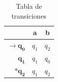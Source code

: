 \documentclass[12pt, twoside, openright]{report} %
\begin{document}
\begin{multicols}{2}
\begin{table}[H]
\centering
\begin{tabular}{r|c|c|}
\cline{2-3}
\multicolumn{1}{l|}{}                                & \textbf{a} & \textbf{b} \\ \hline
\multicolumn{1}{|r|}{$\boldsymbol{\rightarrow q_0}$} & $q_1$      & $q_2$      \\
\multicolumn{1}{|r|}{$\boldsymbol{q_1}$}             & $q_1$      & $q_0$      \\
\multicolumn{1}{|r|}{$\boldsymbol{*q_2}$}            & $q_1$      & $q_2$      \\ \hline
\end{tabular}
\caption{Tabla de transiciones}
\end{table}

\columnbreak
\begin{figure}[H]
	{ %

\begin{tikzpicture}[x=0.75pt,y=0.75pt,yscale=-1,xscale=1]


\end{tikzpicture}}
\end{figure}
\end{multicols}
\end{document}
